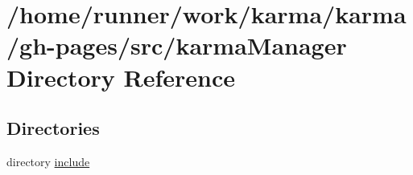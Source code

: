 \section{/home/runner/work/karma/karma/gh-\/pages/src/karma\+Manager Directory Reference}
\label{dir_d5fc9e74ecd446ba07279cb903928e76}
\subsection*{Directories}
\begin{DoxyCompactItemize}
\item 
directory \hyperlink{dir_db5aab25642573dc60c61c7a424e232a}{include}
\end{DoxyCompactItemize}
